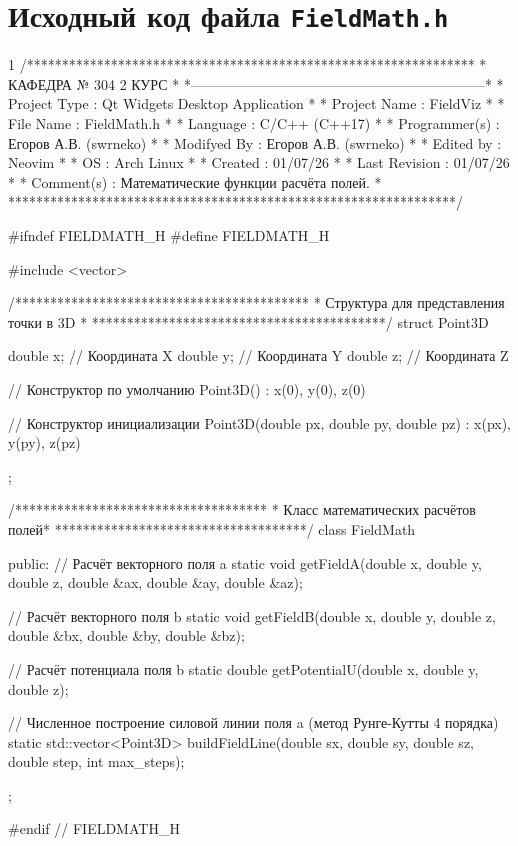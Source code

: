 \section{Исходный код файла \texttt{FieldMath.h}}
\footnotesize
\begin{listing}{1}
/****************************************************************
*                     КАФЕДРА № 304 2 КУРС                       *
*---------------------------------------------------------------*
* Project Type  : Qt Widgets Desktop Application                *
* Project Name  : FieldViz                                      *
* File Name     : FieldMath.h                                    *
* Language      : C/C++ (C++17)                                  *
* Programmer(s) : Егоров А.В. (swrneko)                          *
* Modifyed By   : Егоров А.В. (swrneko)                          *
* Edited by     : Neovim                                         *
* OS            : Arch Linux                                     *
* Created       : 01/07/26                                       *
* Last Revision : 01/07/26                                       *
* Comment(s)    : Математические функции расчёта полей.          *
****************************************************************/

#ifndef FIELDMATH_H
#define FIELDMATH_H

#include <vector>

/******************************************
* Структура для представления точки в 3D *
******************************************/
struct Point3D {
  double x; // Координата X
  double y; // Координата Y
  double z; // Координата Z

  // Конструктор по умолчанию
  Point3D() : x(0), y(0), z(0) {}

  // Конструктор инициализации
  Point3D(double px, double py, double pz) : x(px), y(py), z(pz) {}
};

/************************************
* Класс математических расчётов полей*
************************************/
class FieldMath {
public:
  // Расчёт векторного поля a
  static void getFieldA(double x, double y, double z, double &ax, double &ay, double &az);

  // Расчёт векторного поля b
  static void getFieldB(double x, double y, double z, double &bx, double &by, double &bz);

  // Расчёт потенциала поля b
  static double getPotentialU(double x, double y, double z);

  // Численное построение силовой линии поля a (метод Рунге-Кутты 4 порядка)
  static std::vector<Point3D> buildFieldLine(double sx, double sy, double sz, double step, int max_steps);
};

#endif // FIELDMATH_H

\end{listing}
\normalsize
\pagebreak

